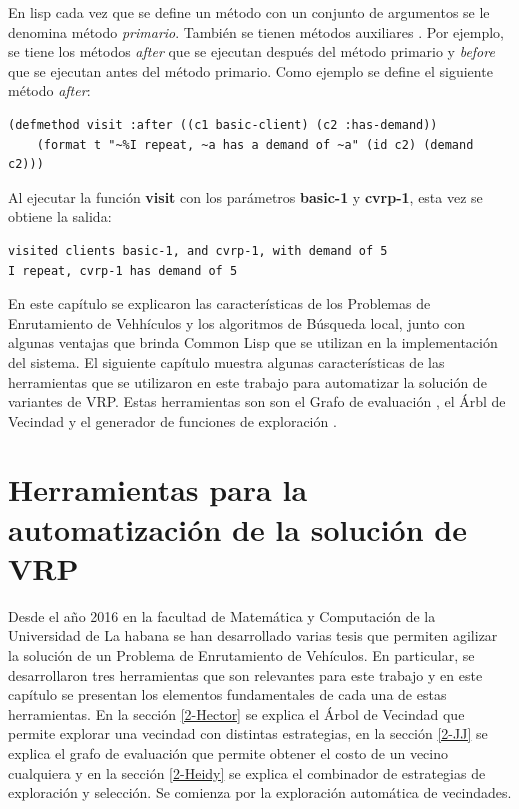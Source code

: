 En lisp cada vez que se define un método con un conjunto de argumentos se le denomina método \textit{primario}. También se tienen métodos auxiliares . Por ejemplo, se tiene los métodos \textit{after} que se ejecutan después del método primario y \textit{before} que se ejecutan antes del método primario. Como ejemplo se define el siguiente método \textit{after}:

\begin{lstlisting}
(defmethod visit :after ((c1 basic-client) (c2 :has-demand))
	(format t "~%I repeat, ~a has a demand of ~a" (id c2) (demand c2)))
\end{lstlisting}

Al ejecutar la función \textbf{visit} con los parámetros \textbf{basic-1} y \textbf{cvrp-1}, esta vez se obtiene la salida:

\begin{lstlisting}
visited clients basic-1, and cvrp-1, with demand of 5
I repeat, cvrp-1 has demand of 5
\end{lstlisting}

En este capítulo se explicaron las características de los Problemas de Enrutamiento de Vehhículos y los algoritmos de Búsqueda local, junto con algunas ventajas que brinda Common Lisp que se utilizan en la implementación del sistema. El siguiente capítulo muestra algunas características de las herramientas que se utilizaron en este trabajo para automatizar la solución de variantes de VRP. Estas herramientas son son el Grafo de evaluación \cite{JJ}, el Árbl de Vecindad \cite{Hector} y el generador de funciones de exploración \cite{Heidy}.


\chapter{Herramientas para la automatización de la solución de VRP}\label{Chapter: Tools}
Desde el año 2016 \cite{Camila} en la facultad de Matemática y Computación de la Universidad de La habana se han desarrollado varias tesis que permiten agilizar la solución de un Problema de Enrutamiento de Vehículos. En particular, se desarrollaron tres herramientas que son relevantes para este trabajo y en este capítulo se presentan los elementos fundamentales de cada una de estas herramientas. En la sección \ref{2-Hector} se explica el Árbol de Vecindad que permite explorar una vecindad con distintas estrategias, en la sección \ref{2-JJ} se explica el grafo de evaluación que permite obtener el costo de un vecino cualquiera y en la sección \ref{2-Heidy} se explica el combinador de estrategias de exploración y selección. Se comienza por la exploración automática de vecindades.

